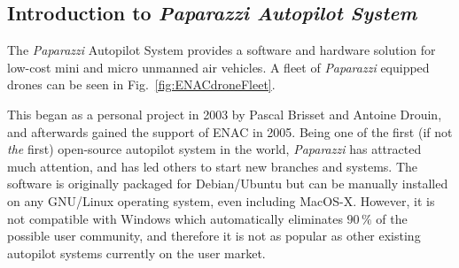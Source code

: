 \subsection{Introduction to \emph{Paparazzi Autopilot System}}

The \emph{Paparazzi} Autopilot System provides a software and hardware solution for low-cost mini and micro unmanned air vehicles. 
A fleet of \emph{Paparazzi} equipped drones can be seen in Fig.~\ref{fig:ENACdroneFleet}.

This began as a personal project in 2003 by Pascal Brisset and Antoine Drouin, and afterwards gained the support of ENAC in 2005. 
Being one of the first (if not \emph{the} first) open-source autopilot system in the world, \emph{Paparazzi} has attracted much attention, and has led others to start new branches and systems. %
The software is originally packaged for Debian/Ubuntu but can be manually installed on any GNU/Linux operating system, even including MacOS-X. 
However, it is not compatible with Windows which automatically eliminates $90\,\%$ of the possible user community, and therefore it is not as popular as other existing autopilot systems currently on the user market.


